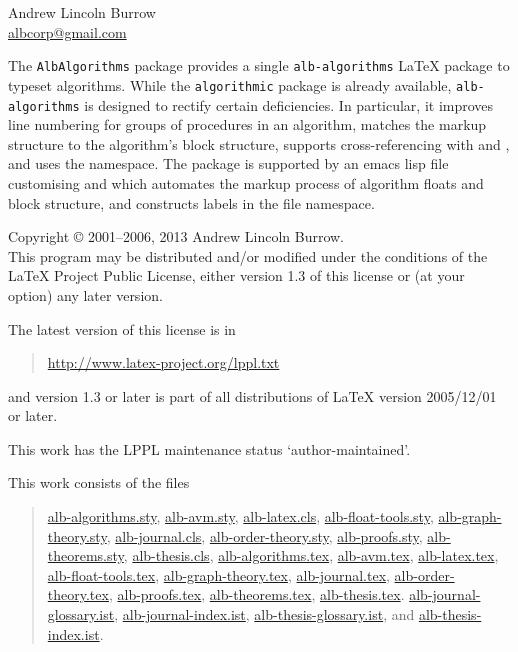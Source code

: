 \documentclass[11pt,a4paper,oneside,titlepage]{alb-latex}
\begin{document}


\begin{albTitlePage}


  Andrew Lincoln Burrow\\
  \url{albcorp@gmail.com}



  The \texttt{AlbAlgorithms} package provides a single
  \texttt{alb-algorithms} \LaTeX{} package to typeset algorithms.  While
  the \texttt{algorithmic} package is already available,
  \texttt{alb-algorithms} is designed to rectify certain deficiencies.
  In particular, it improves line numbering for groups of procedures in
  an algorithm, matches the markup structure to the algorithm's block
  structure, supports cross-referencing with \AUCTeX{} and \RefTeX{},
  and uses the \albLogo{} namespace.  The package is supported by an
  emacs lisp file customising \AUCTeX{} and \RefTeX{} which automates
  the markup process of algorithm floats and block structure, and
  constructs labels in the file namespace.



  Copyright \copyright{} 2001--2006, 2013 Andrew Lincoln Burrow.\\
  This program may be distributed and/or modified under the conditions
  of the \LaTeX{} Project Public License, either version 1.3 of this
  license or (at your option) any later version.

  \medskip{}

  The latest version of this license is in
  \begin{quote}
    \url{http://www.latex-project.org/lppl.txt}
  \end{quote}
  and version 1.3 or later is part of all distributions of LaTeX version
  2005/12/01 or later.

  \medskip{}

  This work has the LPPL maintenance status `author-maintained'.

  \medskip{}

  This work consists of the files
  \begin{quote}
    \begin{flushleft}
      \url{alb-algorithms.sty}, \url{alb-avm.sty}, \url{alb-latex.cls},
      \url{alb-float-tools.sty}, \url{alb-graph-theory.sty},
      \url{alb-journal.cls}, \url{alb-order-theory.sty},
      \url{alb-proofs.sty}, \url{alb-theorems.sty},
      \url{alb-thesis.cls}, \url{alb-algorithms.tex}, \url{alb-avm.tex},
      \url{alb-latex.tex}, \url{alb-float-tools.tex},
      \url{alb-graph-theory.tex}, \url{alb-journal.tex},
      \url{alb-order-theory.tex}, \url{alb-proofs.tex},
      \url{alb-theorems.tex}, \url{alb-thesis.tex}.
      \url{alb-journal-glossary.ist}, \url{alb-journal-index.ist},
      \url{alb-thesis-glossary.ist}, and \url{alb-thesis-index.ist}.
    \end{flushleft}
  \end{quote}



\end{albTitlePage}
\end{document}
